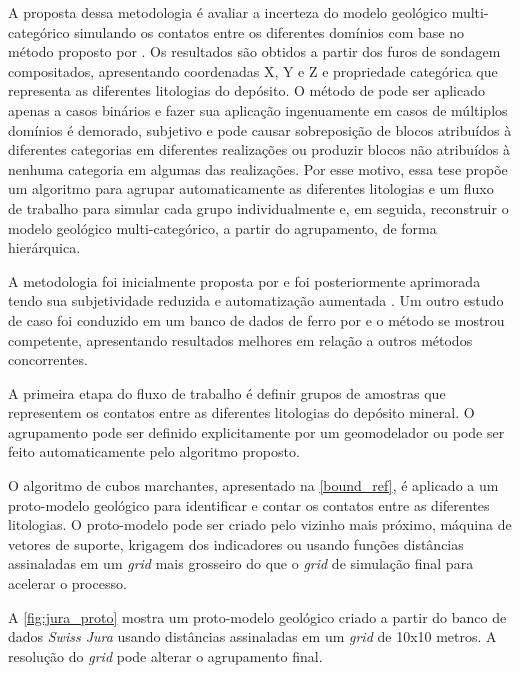 A proposta dessa metodologia é avaliar a incerteza do modelo geológico multi-categórico simulando os contatos entre os diferentes domínios com base no método proposto por . Os resultados são obtidos a partir dos furos de sondagem compositados, apresentando coordenadas X, Y e Z e propriedade categórica que representa as diferentes litologias do depósito. O método de  pode ser aplicado apenas a casos binários e fazer sua aplicação ingenuamente em casos de múltiplos domínios é demorado, subjetivo e pode causar sobreposição de blocos atribuídos à diferentes categorias em diferentes realizações ou produzir blocos não atribuídos à nenhuma categoria em algumas das realizações. Por esse motivo, essa tese propõe um algoritmo para agrupar automaticamente as diferentes litologias e um fluxo de trabalho para simular cada grupo individualmente e, em seguida, reconstruir o modelo geológico multi-categórico, a partir do agrupamento, de forma hierárquica. 

A metodologia foi inicialmente proposta por  e foi posteriormente aprimorada tendo sua subjetividade reduzida e automatização aumentada \cite{amarante2021boundary}. Um outro estudo de caso foi conduzido em um banco de dados de ferro por  e o método se mostrou competente, apresentando resultados melhores em relação a outros métodos concorrentes.

A primeira etapa do fluxo de trabalho é definir grupos de amostras que representem os contatos entre as diferentes litologias do depósito mineral. O agrupamento pode ser definido explicitamente por um geomodelador ou pode ser feito automaticamente pelo algoritmo proposto.

O algoritmo de cubos marchantes, apresentado na \autoref{bound_ref}, é aplicado a um proto-modelo geológico para identificar e contar os contatos entre as diferentes litologias. O proto-modelo pode ser criado pelo vizinho mais próximo, máquina de vetores de suporte, krigagem dos indicadores ou usando funções distâncias assinaladas em um \textit{grid} mais grosseiro do que o \textit{grid} de simulação final para acelerar o processo.

A \autoref{fig:jura_proto} mostra um proto-modelo geológico criado a partir do banco de dados \textit{Swiss Jura} usando distâncias assinaladas em um \textit{grid} de 10x10 metros. A resolução do \textit{grid} pode alterar o agrupamento final.

